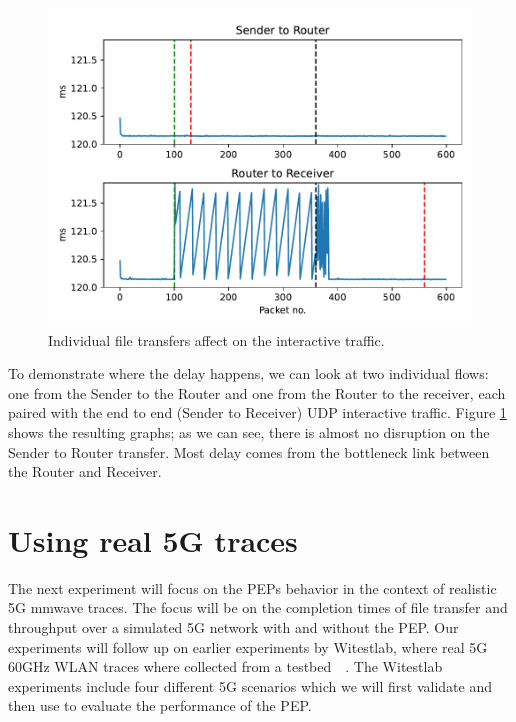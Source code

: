 \documentclass[a4paper,english, 11pt]{report}
\begin{document}
\begin{figure}[h!] %
	\centering
	\includegraphics[scale=0.60]{../diagrams/graphs/compare.pdf}
  	\caption{Individual file transfers affect on the interactive traffic.}
  	\label{fig:graph3}
\end{figure}

To demonstrate where the delay happens, we can look at two individual flows: one from the Sender to the Router and one from the Router to the receiver, each paired with the end to end (Sender to Receiver) UDP interactive traffic. Figure \ref{fig:graph3} shows the resulting graphs; as we can see, there is almost no disruption on the Sender to Router transfer. Most delay comes from the bottleneck link between the Router and Receiver.

\section{Using real 5G traces}

The next experiment will focus on the PEPs behavior in the context of realistic 5G mmwave traces. The focus will be on the completion times of file transfer and throughput over a simulated 5G network with and without the PEP. Our experiments will follow up on earlier experiments by Witestlab, where real 5G 60GHz WLAN traces where collected from a testbed~\cite{Srivastava_Fund_Panwar_2020}~\cite{hingane2020aqm}. The Witestlab experiments include four different 5G scenarios which we will first validate and then use to evaluate the performance of the PEP.
\end{document}
